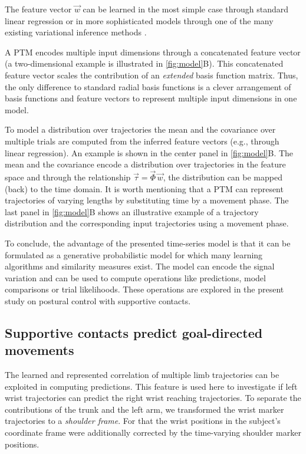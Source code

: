 The feature vector 
$\vec w$ can be learned in the most simple case through standard linear 
regression or in more sophisticated models through one of the many existing 
variational inference methods \cite{Rueckert2015}. 

A PTM encodes multiple input dimensions through a concatenated feature vector (a 
two-dimensional example is illustrated in \FigureAbbrP 
\ref{fig:model}B). This concatenated feature vector scales the contribution of an 
\textit{extended} basis function matrix. Thus, the only difference to standard 
radial basis functions is a clever arrangement of basis functions and feature 
vectors to represent multiple input dimensions in one model. 
 
To model a distribution over trajectories the mean and the covariance over multiple trials are computed from the 
inferred feature vectors (e.g., through linear regression). An example is shown 
in the center panel in \FigureAbbr \ref{fig:model}B. The mean and 
the covariance encode a distribution over trajectories in the feature space and 
through the relationship $\vec \tau = \vec \Phi \, \vec w$, the distribution can 
be mapped (back) to the time domain. It is worth mentioning that a PTM can 
represent trajectories of varying lengths by substituting time by a movement 
phase. The last panel in \FigureAbbr \ref{fig:model}B shows an 
illustrative example of a trajectory distribution and the corresponding input 
trajectories using a movement phase.    

To conclude, the advantage of the presented time-series model is that it can be formulated as a 
generative probabilistic model for which many learning algorithms and similarity 
measures exist. The model can encode the signal variation and can be used to 
compute operations like predictions, model comparisons or trial likelihoods. 
These operations are explored in the present study on postural control with supportive 
contacts. 


\subsection*{Supportive contacts predict goal-directed movements}

The learned and represented correlation of multiple limb trajectories can be 
exploited in computing predictions. This feature is used here to investigate if 
left wrist trajectories can predict the right wrist 
reaching trajectories. To separate the contributions of the trunk and the left 
arm, we transformed the wrist marker trajectories to a \textit{shoulder frame}. 
For that the wrist positions in the subject's coordinate frame were additionally 
corrected by the time-varying shoulder marker positions. 

